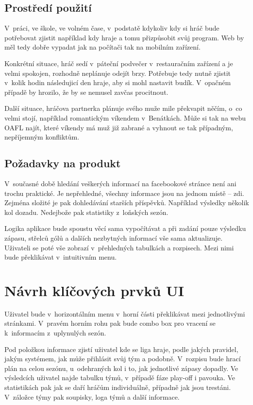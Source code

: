 \documentclass[11pt, a4paper, titlepage]{article}
\begin{document}
\subsection{Prostředí použití}

V~práci, ve škole, ve volném čase, v~podstatě kdykoliv kdy si hráč bude potřebovat zjistit například kdy hraje a tomu přizpůsobit svůj program. Web by měl tedy dobře vypadat jak na počítači tak na mobilním zařízení.
\bigskip

Konkrétní situace, hráč sedí v~páteční podvečer v~restauračním zařízení a je velmi spokojen, rozhodně neplánuje odejít brzy. Potřebuje tedy nutně zjistit v~kolik hodin následujicí den hraje, aby si mohl nastavit budík. V~opačném případě by hrozilo, že by se nemusel zavčas procitnout.
\bigskip

Další situace, hráčova partnerka plánuje svého muže mile překvapit něčím, o~co velmi stojí, například romantickým víkendem v~Benátkách. Může si tak na webu OAFL najít, které víkendy má muž již zabrané a vyhnout se tak případným, nepříjemným konfliktům.

\subsection{Požadavky na produkt}

V~současné době hledání veškerých informací na facebookové stránce není ani trochu praktické. Je nepřehledné, všechny informace jsou na jednom místě -- zdi. Zejména složité je pak dohledávání starších příspěvků. Například výsledky několik kol dozadu. Nedejbože pak statistiky z~loňských sezón.
\bigskip

Logika aplikace bude spoustu věcí sama vypočítávat a při zadání pouze výsledku zápasu, střelců gólů a dalších nezbytných informací vše sama aktualizuje. Uživateli se poté vše zobrazí v~přehledných tabulkách a rozpisech. Mezi nimi bude překlikávat v~intuitivním menu.


\section{Návrh klíčových prvků UI}

Uživatel bude v~horizontálním menu v~horní části překlikávat mezi jednotlivými stránkami. V~pravém horním rohu pak bude combo box pro vracení se k~informacím z~uplynulých sezón.
\bigskip

Pod položkou informace zjistí uživatel kde se liga hraje, podle jakých pravidel, jakým systémem, jak může přihlásit svůj tým a podobně. V~rozpisu bude hrací plán na celou sezónu, u~odehraných kol i to, jak jednotlivé zápasy dopadly. Ve výsledcích uživatel najde tabulku týmů, v~případě fáze play-off i pavouka. Ve statistikách pak jak se daří hráčům individuálně, případně jak jsou trestáni. V~záložce týmy pak soupisky, loga týmů a další informace.
\end{document}

